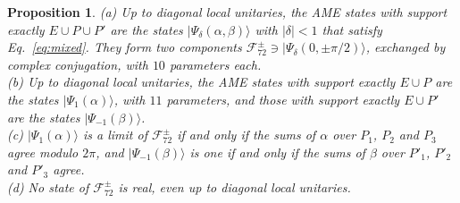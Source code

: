 \documentclass[aps,pra,reprint,superscriptaddress,amsmath,amssymb,longbibliography]{revtex4-2}
\newcommand{\ket}[1]{\lvert #1\rangle}
\theoremstyle{plain}
\newtheorem{proposition}{Proposition}
\begin{document}
\begin{proposition}\label{prop:families}
(a) Up to diagonal local unitaries, the AME states with support exactly $E\cup P\cup P'$ are the states
$\ket{\Psi_\delta(\alpha,\beta)}$ with $|\delta|<1$ that satisfy Eq.~\eqref{eq:mixed}.  They form two components
$\mathcal F_{72}^\pm\ni\ket{\Psi_\delta(0,\pm\pi/2)}$, exchanged by complex conjugation, with $10$ parameters each.\\
(b) Up to diagonal local unitaries, the AME states with support exactly $E\cup P$ are the states
$\ket{\Psi_1(\alpha)}$, with $11$ parameters, and those with support exactly $E\cup P'$ are the states
$\ket{\Psi_{-1}(\beta)}$.\\
(c) $\ket{\Psi_1(\alpha)}$ is a limit of $\mathcal F_{72}^\pm$ if and only if the sums of $\alpha$ over $P_1$, $P_2$
and $P_3$ agree modulo $2\pi$, and $\ket{\Psi_{-1}(\beta)}$ is one if and only if the sums of $\beta$ over $P'_1$,
$P'_2$ and $P'_3$ agree.\\
(d) No state of $\mathcal F_{72}^\pm$ is real, even up to diagonal local unitaries.
\end{proposition}
\end{document}
